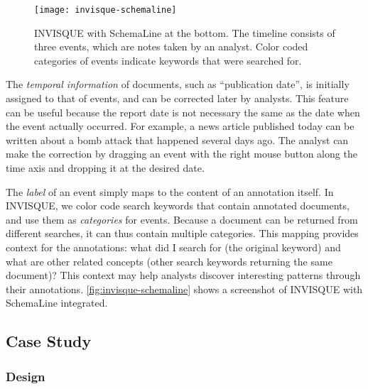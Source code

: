 \begin{figure}[!htb]
	\centering
	\texttt{[image: invisque-schemaline]}
	\caption[INVISQUE with SchemaLine at the bottom]{INVISQUE with SchemaLine at the bottom. The timeline consists of three events, which are notes taken by an analyst. Color coded categories of events indicate keywords that were searched for.}
	\label{fig:invisque-schemaline}
\end{figure}

The \emph{temporal information} of documents, such as ``publication date'', is initially assigned to that of events, and can be corrected later by analysts. This feature can be useful because the report date is not necessary the same as the date when the event actually occurred. For example, a news article published today can be written about a bomb attack that happened several days ago. The analyst can make the correction by dragging an event with the right mouse button along the time axis and dropping it at the desired date. 

The \emph{label} of an event simply maps to the content of an annotation itself. In INVISQUE, we color code search keywords that contain annotated documents, and use them as \emph{categories} for events. Because a document can be returned from different searches, it can thus contain multiple categories. This mapping provides context for the annotations: what did I search for (the original keyword) and what are other related concepts (other search keywords returning the same document)? This context may help analysts discover interesting patterns through their annotations. \autoref{fig:invisque-schemaline} shows a screenshot of INVISQUE with SchemaLine integrated.

\subsection{Case Study}

\subsubsection{Design}

